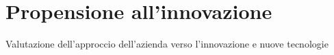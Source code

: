 \section{Propensione all'innovazione}
Valutazione dell'approccio dell'azienda verso l'innovazione e nuove tecnologie


    
    
    

